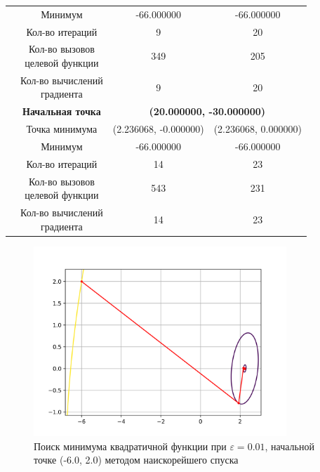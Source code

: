 \begin{table}[H]
\begin{tabular}{|c|c|c|c|}
	\cline{2-4}
	&Минимум &-66.000000 &-66.000000 \\ 
	\cline{2-4}
	&Кол-во итераций &9 &20 \\ 
	\cline{2-4}
	&\makecell{Кол-во вызовов\\целевой функции} &349 &205 \\ 
	\cline{2-4}
	&\makecell{Кол-во вычислений\\градиента} &9 &20 \\ 
	\cline{2-4}
\cline{2-4}&\textbf{Начальная точка} &\multicolumn{2}{c|}{\textbf{(20.000000, -30.000000)}}\\
	\cline{2-4}
	&Точка минимума &(2.236068, -0.000000) &(2.236068, 0.000000) \\ 
	\cline{2-4}
	&Минимум &-66.000000 &-66.000000 \\ 
	\cline{2-4}
	&Кол-во итераций &14 &23 \\ 
	\cline{2-4}
	&\makecell{Кол-во вызовов\\целевой функции} &543 &231 \\ 
	\cline{2-4}
	&\makecell{Кол-во вычислений\\градиента} &14 &23 \\ 
	\cline{2-4}
	\hline

\end{tabular}
\end{table}


            \begin{figure}[H]
	        \centering
	        \includegraphics[width=0.85\textwidth]{Метод наискорейшего спуска, eps 0.01, start = (-6.00, 2.00), Квадратичная функция}%
	        \caption{Поиск минимума квадратичной функции при $\varepsilon = 0.01$, начальной точке (-6.0, 2.0) методом наискорейшего спуска}
	        \vspace*{-1.2cm}
            \end{figure}
            
